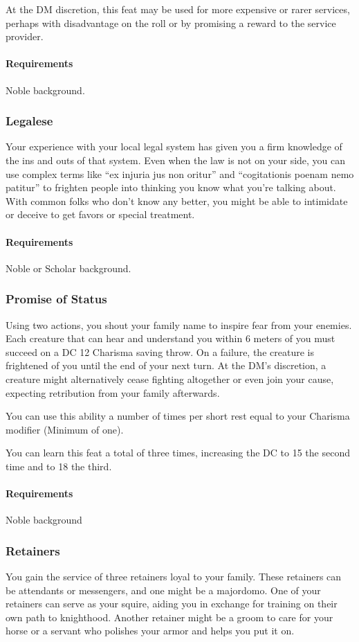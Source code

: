            At the DM discretion, this feat may be used for more expensive or rarer services, perhaps with disadvantage on the roll or by promising a reward to the service provider.
            \paragraph{Requirements} Noble background.
        \subsubsection{Legalese} \label{feat::legalese}
            Your experience with your local legal system has given you a firm knowledge of the ins and outs of that system.
            Even when the law is not on your side, you can use complex terms like ``ex injuria jus non oritur'' and ``cogitationis poenam nemo patitur'' to frighten people into thinking you know what you're talking about.
            With common folks who don't know any better, you might be able to intimidate or deceive to get favors or special treatment.
            \paragraph{Requirements} Noble or Scholar background.
        \subsubsection{Promise of Status} \label{feat::promiseofstatus}
            Using two actions, you shout your family name to inspire fear from your enemies.
            Each creature that can hear and understand you within 6 meters of you must succeed on a DC 12 Charisma saving throw.
            On a failure, the creature is frightened of you until the end of your next turn.
            At the DM's discretion, a creature might alternatively cease fighting altogether or even join your cause, expecting retribution from your family afterwards.

            You can use this ability a number of times per short rest equal to your Charisma modifier (Minimum of one).

            You can learn this feat a total of three times, increasing the DC to 15 the second time and to 18 the third.
            \paragraph{Requirements} Noble background
        \subsubsection{Retainers} \label{feat::retainers}
            You gain the service of three retainers loyal to your family.
            These retainers can be attendants or messengers, and one might be a majordomo.
            One of your retainers can serve as your squire, aiding you in exchange for training on their own path to knighthood.
            Another retainer might be a groom to care for your horse or a servant who polishes your armor and helps you put it on.

